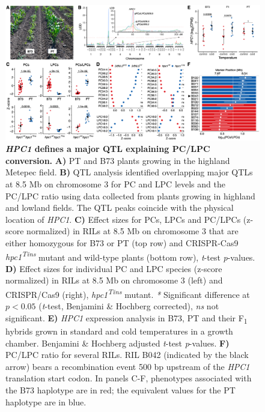 \documentclass[9pt,twocolumn,twoside,lineno]{biorxiv}
\newcommand{\hpc}{\textit{HPC1}\xspace}
\begin{document}
\begin{figure}[ht]
\centering
\includegraphics[width=0.8\paperwidth]{Figures/Fig_3.png}
\caption{\textbf{\hpc defines a major QTL explaining PC/LPC conversion.} 
\textbf{A)} PT and B73 plants growing in the highland Metepec field. 
\textbf{B)} QTL analysis identified overlapping major QTLs at 8.5 Mb on chromosome 3 for PC and LPC levels and the PC/LPC ratio using data collected from plants growing in highland and lowland fields. 
The QTL peaks coincide with the physical location of \hpc. 
\textbf{C)} Effect sizes for PCs, LPCs and PC/LPCs (z-score normalized) in RILs at 8.5 Mb on chromosome 3 that are either homozygous for B73 or PT (top row) and CRISPR-Cas9 \textit{hpc1\textsuperscript{Tins}} mutant and wild-type plants (bottom row), \textit{t}-test \textit{p}-values. 
\textbf{D)} Effect sizes for individual PC and LPC species (z-score normalized) in RILs at 8.5 Mb on chromosome 3 (left) and CRISPR/Cas9 (right),
\textit{hpc1\textsuperscript{Tins}} mutant. \textit{*} Significant difference at $p < 0.05$ (\textit{t}-test, Benjamini \& Hochberg corrected), \textit{ns} not significant.
\textbf{E)} \hpc expression analysis in B73, PT and their F\textsubscript{1} hybrids grown in standard and cold temperatures in a growth chamber. Benjamini \& Hochberg adjusted \textit{t}-test \textit{p}-values.
\textbf{F)} PC/LPC ratio for several RILs. RIL B042 (indicated by the black arrow) bears a recombination event 500 bp upstream of the \hpc translation start codon.
In panels C-F, phenotypes associated with the B73 haplotype are in red; the equivalent values for the PT haplotype are in blue.}
\label{Fig3}
\centering
\end{figure}
\end{document}
